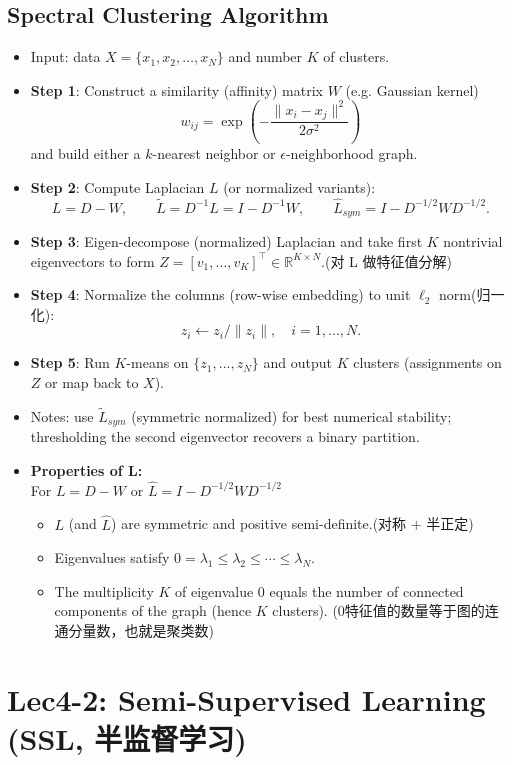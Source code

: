 \documentclass[UTF8]{ctexart}
\begin{document}
\subsection{Spectral Clustering Algorithm}
\begin{itemize}
    \item Input: data $X=\{x_1,x_2,\ldots,x_N\}$ and number $K$ of clusters.
    \item \textbf{Step 1}: Construct a similarity (affinity) matrix $W$ (e.g. Gaussian kernel)
    \[w_{ij}=\exp\left(-\frac{\|x_i-x_j\|^2}{2\sigma^2}\right)\]
    and build either a $k$-nearest neighbor or $\epsilon$-neighborhood graph.
    \item \textbf{Step 2}: Compute Laplacian $L$ (or normalized variants):
    \[L=D-W,\qquad \widetilde{L}=D^{-1}L=I-D^{-1}W,\qquad \hat{L}_{sym}=I-D^{-1/2}WD^{-1/2}.
    \]
    \item \textbf{Step 3}: Eigen-decompose (normalized) Laplacian and take first $K$ nontrivial eigenvectors to form $Z= [v_1,\ldots,v_K]^\top\in\mathbb{R}^{K\times N}$.(对 L 做特征值分解)
    \item \textbf{Step 4}: Normalize the columns (row-wise embedding) to unit $\ell_2$ norm(归一化):
    \[z_i\leftarrow z_i/\|z_i\|,\quad i=1,\ldots,N.
    \]
    \item \textbf{Step 5}: Run $K$-means on $\{z_1,\ldots,z_N\}$ and output $K$ clusters (assignments on $Z$ or map back to $X$).
    \item Notes: use $\widetilde{L}_{sym}$ (symmetric normalized) for best numerical stability; thresholding the second eigenvector recovers a binary partition.
    \item \textbf{Properties of L:}\\
    For $L = D - W$ or $\hat{L} = I - D^{-1/2} W D^{-1/2}$
    \begin{itemize}
        \item $L$ (and $\hat{L}$) are symmetric and positive semi-definite.(对称 + 半正定)
        \item Eigenvalues satisfy $0=\lambda_1\le\lambda_2\le\cdots\le\lambda_N$.
        \item The multiplicity $K$ of eigenvalue $0$ equals the number of connected components of the graph (hence $K$ clusters).
        (0特征值的数量等于图的连通分量数，也就是聚类数)
    \end{itemize}
\end{itemize}

\section{Lec4-2: Semi-Supervised Learning (SSL, 半监督学习)}
\end{document}
